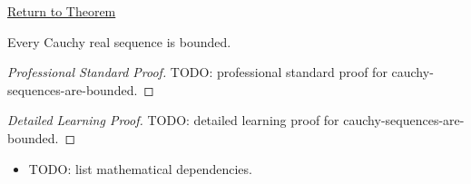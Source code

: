 \newpage
{}
\label{prf:cauchy-sequences-are-bounded}

\begin{remark*}[Return]
\hyperref[thm:cauchy-sequences-are-bounded]{Return to Theorem}
\end{remark*}

\begin{theorem*}
Every Cauchy real sequence is bounded.

\smallskip
\noindent
\end{theorem*}

\begin{proof}[Professional Standard Proof]
\LRAProofBodyStart
TODO: professional standard proof for cauchy-sequences-are-bounded.
\end{proof}

\begin{proof}[Detailed Learning Proof]
\LRAProofBodyStart
TODO: detailed learning proof for cauchy-sequences-are-bounded.
\end{proof}

\begin{remark*}
\end{remark*}

\begin{dependencies}
\begin{itemize}
  \item TODO: list mathematical dependencies.
\end{itemize}
\end{dependencies}

\clearpage
